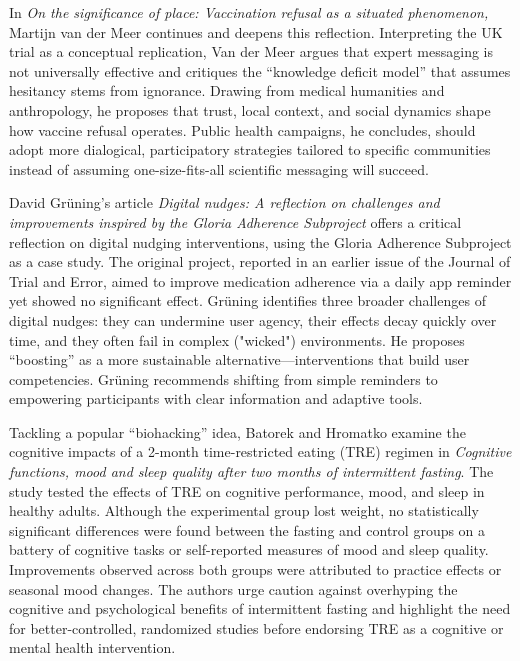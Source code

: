 \documentclass[authordate, empirical, issue]{jote-new-article}
\begin{document}
	In \emph{On the significance of place: Vaccination refusal as a situated phenomenon,} Martijn van der Meer continues and deepens this reflection. Interpreting the UK trial as a conceptual replication, Van der Meer argues that expert messaging is not universally effective and critiques the “knowledge deficit model” that assumes hesitancy stems from ignorance. Drawing from medical humanities and anthropology, he proposes that trust, local context, and social dynamics shape how vaccine refusal operates. Public health campaigns, he concludes, should adopt more dialogical, participatory strategies tailored to specific communities instead of assuming one-size-fits-all scientific messaging will succeed.



	David Grüning's article \emph{Digital nudges: A reflection on challenges and improvements inspired by the Gloria Adherence Subproject} offers a critical reflection on digital nudging interventions, using the Gloria Adherence Subproject as a case study. The original project, reported in an earlier issue of the Journal of Trial and Error, aimed to improve medication adherence via a daily app reminder yet showed no significant effect. Grüning identifies three broader challenges of digital nudges: they can undermine user agency, their effects decay quickly over time, and they often fail in complex ("wicked") environments. He proposes “boosting” as a more sustainable alternative—interventions that build user competencies. Grüning recommends shifting from simple reminders to empowering participants with clear information and adaptive tools.



	Tackling a popular “biohacking” idea, Batorek and Hromatko examine the cognitive impacts of a 2-month time-restricted eating (TRE) regimen in \emph{Cognitive functions, mood and sleep quality after two months of intermittent fasting}. The study tested the effects of TRE on cognitive performance, mood, and sleep in healthy adults. Although the experimental group lost weight, no statistically significant differences were found between the fasting and control groups on a battery of cognitive tasks or self-reported measures of mood and sleep quality. Improvements observed across both groups were attributed to practice effects or seasonal mood changes. The authors urge caution against overhyping the cognitive and psychological benefits of intermittent fasting and highlight the need for better-controlled, randomized studies before endorsing TRE as a cognitive or mental health intervention.
\end{document}
